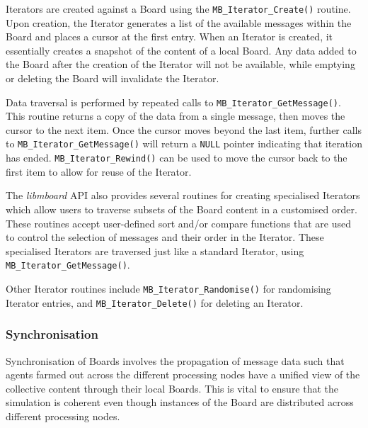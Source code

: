 Iterators are created against a Board using the \texttt{MB\_Iterator\_Create()} routine. Upon creation, the Iterator generates a list of the available messages within the Board and places a cursor at the first entry. When an Iterator is created, it essentially creates a snapshot of the content of a local Board. Any data added to the Board after the creation of the Iterator will not be available, while emptying or deleting the Board will invalidate the Iterator.

Data traversal is performed by repeated calls to \texttt{MB\_Iterator\_GetMessage()}. This routine returns a copy of the data from a single message, then moves the cursor to the next item. Once the cursor moves beyond the last item, further calls to \texttt{MB\_Iterator\_GetMessage()} will return a \texttt{NULL} pointer indicating that iteration has ended. \texttt{MB\_Iterator\_Rewind()} can be used to move the cursor back to the first item to allow for reuse of the Iterator.

The \textit{libmboard} API also provides several routines for creating specialised Iterators which allow users to traverse subsets of the Board content in a customised order. These routines accept user-defined sort and/or compare functions that are used to control the selection of messages and their order in the Iterator. These specialised Iterators are traversed just like a standard Iterator, using \texttt{MB\_Iterator\_GetMessage()}.

Other Iterator routines include \texttt{MB\_Iterator\_Randomise()} for randomising Iterator entries, and \texttt{MB\_Iterator\_Delete()} for deleting an Iterator.


\subsubsection{Synchronisation}
\label{sec:mb_sync}

Synchronisation of Boards involves the propagation of message data such that agents farmed out across the different processing nodes have a unified view of the collective content through their local Boards. This is vital to ensure that the simulation is coherent even though instances of the Board are distributed across different processing nodes.

